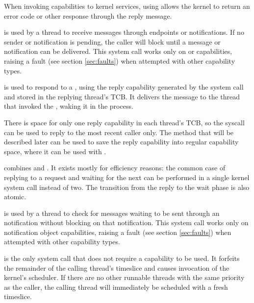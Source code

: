 \begin{description}
    When invoking capabilities to kernel services, using
     allows the kernel to return an error code
    or other response through the reply message.

    \item[\apifunc{seL4\_Wait}{sel4_wait}] is used by a thread to receive
    messages through endpoints or notifications. If no sender or
    notification is pending, the caller
    will block until a message or notification can be delivered. This system call works only on
     or  capabilities, raising a fault (see section \ref{sec:faults}) when
    attempted with other capability types.

    \item[\apifunc{seL4\_Reply}{sel4_reply}] is used to respond to a
    , using the reply capability generated by the
     system call and stored in the replying
    thread's TCB. It delivers the message to the thread that invoked
    the , waking it in
    the process.

    There is space for only one reply capability in each thread's TCB, so the
     syscall can be used to reply to the most
    recent caller only. The 
    method that will be described later can be used to save the reply
    capability into regular capability space, where it can be used with
    .

    \item[\apifunc{seL4\_ReplyWait}{sel4_replywait}] combines  and
    . It exists mostly for efficiency reasons: the common case of
    replying to a request and waiting for the next can be performed in
    a single kernel system call instead of two. The transition from
    the reply to the wait phase is also atomic.

    \item[\apifunc{seL4\_NBWait}{sel4_nbwait}] is used by a thread to check for
    messages waiting to be sent through an notification without blocking on
    that notification. This system call works only on notification object 
    capabilities, raising a fault (see section \ref{sec:faults}) when attempted
    with other capability types.

    \item[\apifunc{seL4\_Yield}{sel4_yield}] is the only system call that does not require
    a capability to be used. It forfeits the remainder of the calling thread's
    timeslice and causes invocation of the kernel's scheduler.
    If there are no other runnable threads with the same
    priority as the caller, the calling thread will immediately be
    scheduled with a fresh timeslice.
\end{description}

